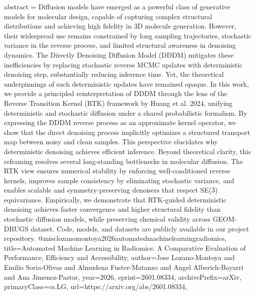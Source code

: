 {      abstract = {Diffusion models have emerged as a powerful class of generative models for molecular design, capable of capturing complex structural distributions and achieving high fidelity in 3D molecule generation. However, their widespread use remains constrained by long sampling trajectories, stochastic variance in the reverse process, and limited structural awareness in denoising dynamics. The Directly Denoising Diffusion Model (DDDM) mitigates these inefficiencies by replacing stochastic reverse MCMC updates with deterministic denoising step, substantially reducing inference time. Yet, the theoretical underpinnings of such deterministic updates have remained opaque. In this work, we provide a principled reinterpretation of DDDM through the lens of the Reverse Transition Kernel (RTK) framework by Huang et al. 2024, unifying deterministic and stochastic diffusion under a shared probabilistic formalism. By expressing the DDDM reverse process as an approximate kernel operator, we show that the direct denoising process implicitly optimizes a structured transport map between noisy and clean samples. This perspective elucidates why deterministic denoising achieves efficient inference. Beyond theoretical clarity, this reframing resolves several long-standing bottlenecks in molecular diffusion. The RTK view ensures numerical stability by enforcing well-conditioned reverse kernels, improves sample consistency by eliminating stochastic variance, and enables scalable and symmetry-preserving denoisers that respect SE(3) equivariance. Empirically, we demonstrate that RTK-guided deterministic denoising achieves faster convergence and higher structural fidelity than stochastic diffusion models, while preserving chemical validity across GEOM-DRUGS dataset. Code, models, and datasets are publicly available in our project repository.}
}@misc{lozanomontoya2026automatedmachinelearningradiomics,
      title={Automated Machine Learning in Radiomics: A Comparative Evaluation of Performance, Efficiency and Accessibility}, 
      author={Jose Lozano-Montoya and Emilio Soria-Olivas and Almudena Fuster-Matanzo and Angel Alberich-Bayarri and Ana Jimenez-Pastor},
      year={2026},
      eprint={2601.08334},
      archivePrefix={arXiv},
      primaryClass={cs.LG},
      url={https://arxiv.org/abs/2601.08334},
}
